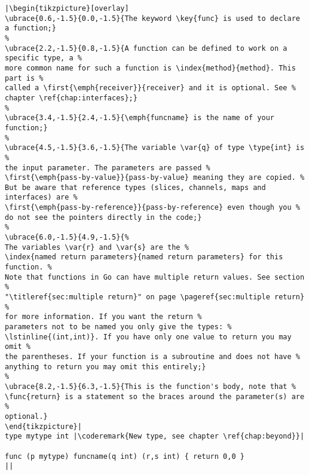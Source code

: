 \begin{lstlisting}[caption=A function declaration,label=src:function definition]
|\begin{tikzpicture}[overlay]
\ubrace{0.6,-1.5}{0.0,-1.5}{The keyword \key{func} is used to declare a function;}
%
\ubrace{2.2,-1.5}{0.8,-1.5}{A function can be defined to work on a specific type, a %
more common name for such a function is \index{method}{method}. This part is %
called a \first{\emph{receiver}}{receiver} and it is optional. See %
chapter \ref{chap:interfaces};}
%
\ubrace{3.4,-1.5}{2.4,-1.5}{\emph{funcname} is the name of your function;}
%
\ubrace{4.5,-1.5}{3.6,-1.5}{The variable \var{q} of type \type{int} is %
the input parameter. The parameters are passed %
\first{\emph{pass-by-value}}{pass-by-value} meaning they are copied. %
But be aware that reference types (slices, channels, maps and interfaces) are %
\first{\emph{pass-by-reference}}{pass-by-reference} even though you %
do not see the pointers directly in the code;}
%
\ubrace{6.0,-1.5}{4.9,-1.5}{%
The variables \var{r} and \var{s} are the %
\index{named return parameters}{named return parameters} for this function. %
Note that functions in Go can have multiple return values. See section %
"\titleref{sec:multiple return}" on page \pageref{sec:multiple return} %
for more information. If you want the return %
parameters not to be named you only give the types: %
\lstinline{(int,int)}. If you have only one value to return you may omit %
the parentheses. If your function is a subroutine and does not have %
anything to return you may omit this entirely;}
%
\ubrace{8.2,-1.5}{6.3,-1.5}{This is the function's body, note that %
\func{return} is a statement so the braces around the parameter(s) are %
optional.}
\end{tikzpicture}|
type mytype int	|\coderemark{New type, see chapter \ref{chap:beyond}}|

func (p mytype) funcname(q int) (r,s int) { return 0,0 }
||
\end{lstlisting}
